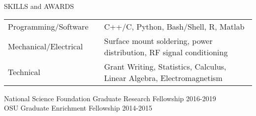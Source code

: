 \documentclass{resume} %
\begin{document}
\begin{rSection}{SKILLS and AWARDS}

\begin{tabular}{@{}l l l@{}}
Programming/Software & & C++/C, Python, Bash/Shell, R, Matlab \\ 
Mechanical/Electrical & & Surface mount soldering, power distribution, RF signal conditioning  \\ 
Technical & & Grant Writing, Statistics, Calculus, Linear Algebra, Electromagnetism\\
\end{tabular}

National Science Foundation Graduate Research Fellowship \hfill 2016-2019 \\
OSU Graduate Enrichment Fellowship \hfill 2014-2015
\end{rSection}

\end{document}
